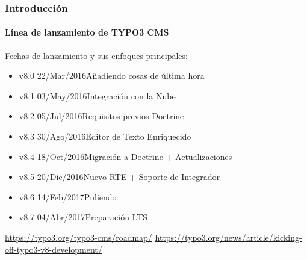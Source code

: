 \begin{frame}[fragile]
	\frametitle{Introducción}
	\framesubtitle{Línea de lanzamiento de TYPO3 CMS}

	Fechas de lanzamiento y sus enfoques principales:

	\begin{itemize}

		\item v8.0 \tabto{1.1cm}22/Mar/2016\tabto{3.4cm}Añadiendo cosas de última hora
		\item v8.1 \tabto{1.1cm}03/May/2016\tabto{3.4cm}Integración con la Nube
		\item v8.2 \tabto{1.1cm}05/Jul/2016\tabto{3.4cm}Requisitos previos Doctrine
		\item v8.3 \tabto{1.1cm}30/Ago/2016\tabto{3.4cm}Editor de Texto Enriquecido
		\item v8.4 \tabto{1.1cm}18/Oct/2016\tabto{3.4cm}Migración a Doctrine + Actualizaciones
		\item v8.5 \tabto{1.1cm}20/Dic/2016\tabto{3.4cm}Nuevo RTE + Soporte de Integrador
		\item
			\begingroup
				\color{typo3orange}
					v8.6 \tabto{1.1cm}14/Feb/2017\tabto{3.4cm}Puliendo
			\endgroup
		\item v8.7 \tabto{1.1cm}04/Abr/2017\tabto{3.4cm}Preparación LTS

	\end{itemize}

	\smaller
		\url{https://typo3.org/typo3-cms/roadmap/}\newline
		\url{https://typo3.org/news/article/kicking-off-typo3-v8-development/}
	\normalsize

\end{frame}

